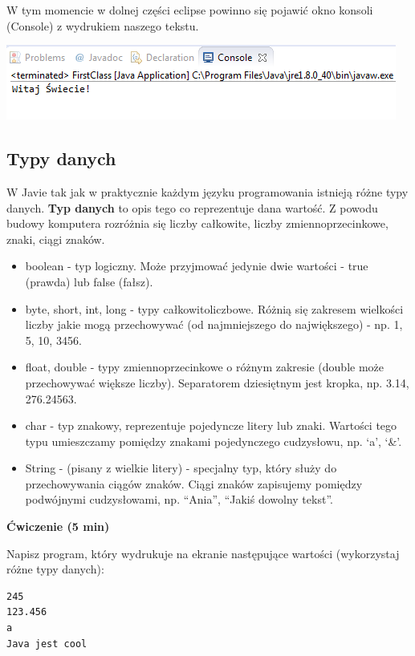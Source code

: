 \documentclass[letterpaper,10pt,english]{sphinxmanual}
\begin{document}
W tym momencie w dolnej części eclipse powinno się pojawić okno konsoli (Console) z wydrukiem naszego tekstu.

{\hfill\includegraphics{run.png}\hfill}


\subsection{Typy danych}
\label{wprowadzenie:typy-danych}
W Javie tak jak w praktycznie każdym języku programowania istnieją różne typy danych. \textbf{Typ danych} to opis tego co reprezentuje dana wartość. Z powodu budowy komputera rozróżnia się liczby całkowite, liczby zmiennoprzecinkowe, znaki, ciągi znaków.
\begin{itemize}
\item {} 
boolean - typ logiczny. Może przyjmować jedynie dwie wartości - true (prawda) lub false (fałsz).

\item {} 
byte, short, int, long - typy całkowitoliczbowe. Różnią się zakresem wielkości liczby jakie mogą przechowywać (od najmniejszego do największego) - np. 1, 5, 10, 3456.

\item {} 
float, double - typy zmiennoprzecinkowe o różnym zakresie (double może przechowywać większe liczby). Separatorem dziesiętnym jest kropka, np. 3.14, 276.24563.

\item {} 
char - typ znakowy, reprezentuje pojedyncze litery lub znaki. Wartości tego typu umieszczamy pomiędzy znakami pojedynczego cudzysłowu, np. `a', `\&'.

\item {} 
String - (pisany z wielkie litery) - specjalny typ, który służy do przechowywania ciągów znaków. Ciągi znaków zapisujemy pomiędzy podwójnymi cudzysłowami, np. ``Ania'', ``Jakiś dowolny tekst''.

\end{itemize}

\textbf{Ćwiczenie (5 min)}

Napisz program, który wydrukuje na ekranie następujące wartości (wykorzystaj różne typy danych):

\begin{Verbatim}[commandchars=\\\{\}]
245
123.456
a
Java jest cool
\end{Verbatim}
\end{document}

